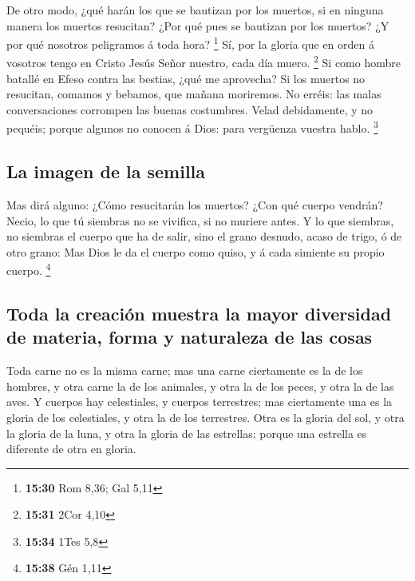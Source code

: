  De otro modo, ¿qué harán los que se bautizan por los
muertos, si en ninguna manera los muertos resucitan? ¿Por qué pues se
bautizan por los muertos?  ¿Y por qué nosotros peligramos á
toda hora? \footnote{\textbf{15:30} Rom 8,36; Gal 5,11} 
Sí, por la gloria que en orden á vosotros tengo en Cristo Jesús Señor
nuestro, cada día muero. \footnote{\textbf{15:31} 2Cor 4,10}
 Si como hombre batallé en Efeso contra las bestias, ¿qué
me aprovecha? Si los muertos no resucitan, comamos y bebamos, que mañana
moriremos.  No erréis: las malas conversaciones corrompen
las buenas costumbres.  Velad debidamente, y no pequéis;
porque algunos no conocen á Dios: para vergüenza vuestra hablo.
\footnote{\textbf{15:34} 1Tes 5,8}

\hypertarget{la-imagen-de-la-semilla}{%
\subsection{La imagen de la semilla}\label{la-imagen-de-la-semilla}}

 Mas dirá alguno: ¿Cómo resucitarán los muertos? ¿Con qué
cuerpo vendrán?  Necio, lo que tú siembras no se vivifica,
si no muriere antes.  Y lo que siembras, no siembras el
cuerpo que ha de salir, sino el grano desnudo, acaso de trigo, ó de otro
grano:  Mas Dios le da el cuerpo como quiso, y á cada
simiente su propio cuerpo. \footnote{\textbf{15:38} Gén 1,11}

\hypertarget{toda-la-creaciuxf3n-muestra-la-mayor-diversidad-de-materia-forma-y-naturaleza-de-las-cosas}{%
\subsection{Toda la creación muestra la mayor diversidad de materia,
forma y naturaleza de las
cosas}\label{toda-la-creaciuxf3n-muestra-la-mayor-diversidad-de-materia-forma-y-naturaleza-de-las-cosas}}

 Toda carne no es la misma carne; mas una carne ciertamente
es la de los hombres, y otra carne la de los animales, y otra la de los
peces, y otra la de las aves.  Y cuerpos hay celestiales, y
cuerpos terrestres; mas ciertamente una es la gloria de los celestiales,
y otra la de los terrestres.  Otra es la gloria del sol, y
otra la gloria de la luna, y otra la gloria de las estrellas: porque una
estrella es diferente de otra en gloria.

